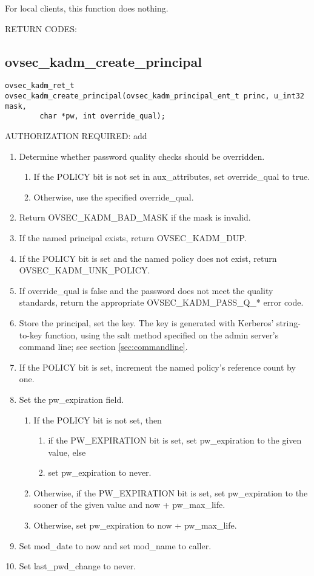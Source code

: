 For local clients, this function does nothing.

RETURN CODES:

\subsection{ovsec_kadm_create_principal}

\begin{verbatim}
ovsec_kadm_ret_t
ovsec_kadm_create_principal(ovsec_kadm_principal_ent_t princ, u_int32 mask,
		char *pw, int override_qual);
\end{verbatim}

AUTHORIZATION REQUIRED: add

\begin{enumerate}
\item Determine whether password quality checks should be overridden.
\begin{enumerate}
\item If the POLICY bit is not set in aux_attributes, set
override_qual to true.
\item Otherwise, use the specified override_qual.
\end{enumerate}

\item Return OVSEC_KADM_BAD_MASK if the mask is invalid.
\item If the named principal exists, return OVSEC_KADM_DUP.
\item If the POLICY bit is set and the named policy does not exist,
return OVSEC_KADM_UNK_POLICY.
\item If override_qual is false and the password does not meet the
quality standards, return the appropriate OVSEC_KADM_PASS_Q_* error
code.
\item Store the principal, set the key.  The key is generated with
Kerberos' string-to-key function, using the salt method specified on
the admin server's command line; see section \ref{sec:commandline}.
\item If the POLICY bit is set, increment the named policy's reference
count by one.

\item Set the pw_expiration field.
\begin{enumerate}
\item If the POLICY bit is not set, then
\begin{enumerate}
\item if the PW_EXPIRATION bit is set, set pw_expiration to the given
value, else
\item set pw_expiration to never.
\end{enumerate}
\item Otherwise, if the PW_EXPIRATION bit is set, set pw_expiration to
the sooner of the given value and now + pw_max_life.
\item Otherwise, set pw_expiration to now + pw_max_life.
\end{enumerate}

\item Set mod_date to now and set mod_name to caller.
\item Set last_pwd_change to never.
\end{enumerate}

